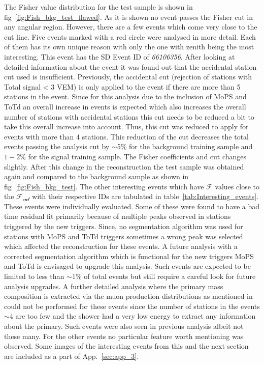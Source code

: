 The Fisher value distribution for the test sample is shown in fig~\ref{fig:Fish_bkg_test_flawed}. As it is shown no event passes the Fisher cut in any angular region. However, there are a few events which come very close to the cut line. Five events marked with a red circle were analysed in more detail. Each of them has its own unique reason with only the one with zenith being the most interesting. This event has the SD Event ID of \textit{66106356}. After looking at detailed information about the event it was found out that the accidental station cut used is insufficient. Previously, the  accidental cut (rejection of stations with Total signal < 3 VEM) is only applied to the event if there are more than 5 stations in the event. Since for this analysis due to the inclusion of MoPS and ToTd an overall increase in events is expected which also increases the overall number of stations with accidental stations this cut needs to be reduced a bit to take this overall increase into account. Thus, this cut was reduced to apply for events with more than 4 stations. This reduction of the cut decreases the total events passing the analysis cut by $\sim$5\% for the background training sample and $1-2$\% for the signal training sample. The Fisher coefficients and cut changes slightly. After this change in the reconstruction the test sample was obtained again and compared to the background sample as shown in fig~\ref{fig:Fish_bkg_test}. The other interesting events which have $\mathcal{F}$ values close to the $\mathcal{F_{cut}}$ with their respective IDs are tabulated in table~\ref{tab:Interesting_events}. These events were individually evaluated. Some of these were found to have a bad time residual fit primarily because of multiple peaks observed in stations triggered by the new triggers. Since, no segmentation algorithm was used for stations with MoPS and ToTd triggers sometimes a wrong peak was selected which affected the reconstruction for these events. A future analysis with a corrected segmentation algorithm which is functional for the new triggers MoPS and ToTd is envisaged to upgrade this analysis. Such events are expected to be limited to less than $\sim$1\% of total events but still require a careful look for future analysis upgrades. A further detailed analysis where the primary mass composition is extracted via the muon production distributions as mentioned in~\cite{PierreAuger:2014zay} could not be performed for these events since the number of stations in the events $\sim 4$ are too few and the shower had a very low energy to extract any information about the primary. Such events were also seen in previous analysis albeit not these many. For the other events no particular feature worth mentioning was observed. Some images of the interesting events from this and the next section are included as a part of App.~\ref{sec:app_3}. 

